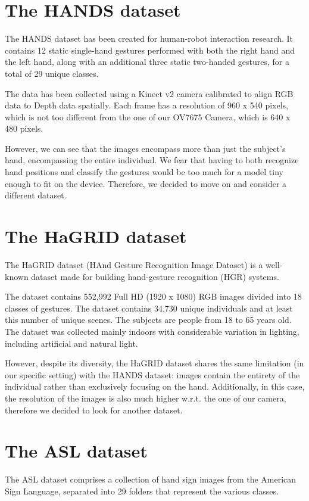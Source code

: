 \documentclass{Configuration_Files/PoliMi3i_thesis}
\begin{document}
\section{The HANDS dataset}
\label{sec:hands}
The HANDS dataset \cite{hands} has been created for human-robot interaction research. It contains 12 static single-hand gestures performed with both the right hand and the left hand, along with an additional three static two-handed gestures, for a total of 29 unique classes.

The data has been collected using a Kinect v2 camera calibrated to align RGB data to Depth data spatially. Each frame has a resolution of 960 x 540 pixels, which is not too different from the one of our OV7675 Camera, which is 640 x 480 pixels.

However, we can see that the images encompass more than just the subject's hand, encompassing the entire individual. We fear that having to both recognize hand positions and classify the gestures would be too much for a model tiny enough to fit on the device. Therefore, we decided to move on and consider a different dataset.

\section{The HaGRID dataset}
\label{sec:hagrid}
The HaGRID dataset \cite{hagrid}  (HAnd Gesture Recognition Image Dataset) is a well-known dataset made for building hand-gesture recognition (HGR) systems.

The dataset contains 552,992 Full HD (1920 x 1080) RGB images divided into 18 classes of gestures. The dataset contains 34,730 unique individuals and at least this number of unique scenes. The subjects are people from 18 to 65 years old. The dataset was collected mainly indoors with considerable variation in lighting, including artificial and natural light.

However, despite its diversity, the HaGRID dataset shares the same limitation (in our specific setting) with the HANDS dataset: images contain the entirety of the individual rather than exclusively focusing on the hand. Additionally, in this case, the resolution of the images is also much higher w.r.t. the one of our camera, therefore we decided to look for another dataset.

\section{The ASL dataset}
\label{sec:asl}
The ASL dataset \cite{asl}  comprises a collection of hand sign images from the American Sign Language, separated into 29 folders that represent the various classes.
\end{document}
